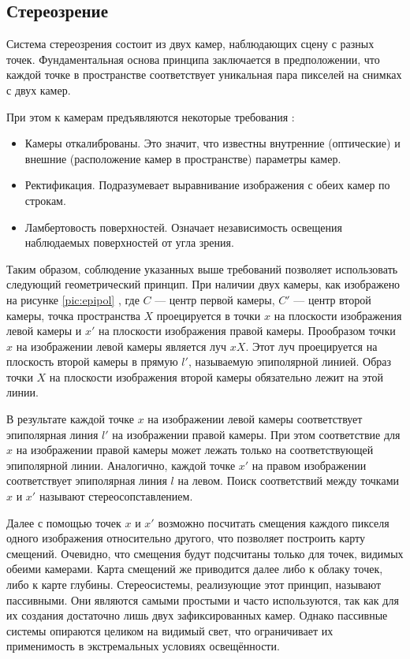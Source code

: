
\subsection{Стереозрение}
\label{stereovision}
Система стереозрения состоит из двух камер, наблюдающих сцену с разных точек. 
Фундаментальная основа принципа заключается в предположении, что каждой точке в пространстве соответствует уникальная пара пикселей на снимках с двух камер.  

При этом к камерам предъявляются некоторые требования \cite{rusoverview}:   %
\begin{itemize}
	\item Камеры откалиброваны. Это значит, что известны внутренние (оптические) и внешние (расположение камер в пространстве) параметры камер. 
	\item Ректификация. Подразумевает выравнивание изображения с обеих камер по строкам.  %
	\item Ламбертовость поверхностей. Означает независимость освещения наблюдаемых поверхностей от угла зрения. 
\end{itemize}

Таким образом, соблюдение указанных выше требований позволяет использовать следующий геометрический принцип. При наличии двух камеры, как изображено 
на рисунке \ref{pic:epipol} \cite{Hartley2004}, где $C$ — центр первой камеры, $C'$ — центр второй камеры, точка пространства $X$  
проецируется в точки $x$ на плоскости изображения левой камеры и $x'$ на плоскости изображения правой камеры. Прообразом точки $x$ на изображении левой 
камеры является луч $xX$. Этот луч проецируется на плоскость второй камеры в прямую $l'$, называемую эпиполярной линией. Образ точки $X$ на плоскости 
изображения второй камеры обязательно лежит на этой линии.


В результате каждой точке $x$ на изображении левой камеры соответствует эпиполярная линия $l'$ на изображении правой камеры. При этом соответствие для $x$ на 
изображении правой камеры может лежать только на соответствующей эпиполярной линии. Аналогично, каждой точке $x'$ на правом изображении соответствует 
эпиполярная линия $l$ на левом. Поиск соответствий между точками $x$ и $x'$ называют стереосопставлением.


Далее с помощью точек $x$ и $x'$ возможно посчитать смещения каждого пикселя одного изображения относительно другого, что позволяет построить карту смещений. 
Очевидно, что смещения будут подсчитаны только для точек, видимых обеими камерами. Карта смещений же приводится далее либо к облаку точек, либо к карте глубины. 
Стереосистемы, реализующие этот принцип, называют пассивными. Они являются самыми простыми и часто используются, так как для их создания достаточно лишь
двух зафиксированных камер. Однако пассивные системы опираются целиком на видимый свет, что ограничивает их применимость в экстремальных условиях освещённости. %


